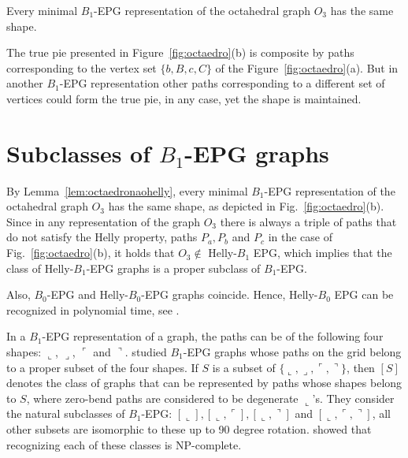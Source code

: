 \begin{lemma}\label{lem:octaedronaohelly}
Every minimal $B_1$-EPG representation of the octahedral graph $O_3$ has the same shape.
\end{lemma}

 


The true pie presented in Figure~\ref{fig:octaedro}(b) is composite by paths corresponding to the vertex set $\{b, B, c, C\}$ of the Figure~\ref{fig:octaedro}(a). But in another $B_1$-EPG representation other paths corresponding to a different set of vertices could form the true pie, in any case, yet the shape is maintained. 



\section{Subclasses of $B_1$-EPG graphs}


By Lemma~\ref{lem:octaedronaohelly}, every minimal $B_1$-EPG representation of the octahedral graph $O_3$ has the same shape, as depicted in Fig.~\ref{fig:octaedro}(b). 
Since in any representation of the graph $O_3$ there is always a triple of paths that do not satisfy the Helly property, paths $P_{a}, P_{b} $ and $P_{c}$ in the case of Fig.~\ref{fig:octaedro}(b), it holds that $O_3 \notin$ Helly-$B_1$ EPG, which implies that the class of Helly-$B_1$-EPG graphs is a proper subclass of $B_1$-EPG.

Also, $B_0$-EPG and Helly-$B_0$-EPG graphs coincide. Hence, Helly-$B_0$ EPG can be recognized in polynomial time, see \cite{booth1976}.


In a $B_1$-EPG representation of a graph, the paths can be of the following four shapes: $\llcorner$, $\lrcorner$, $\ulcorner$ and $\urcorner$. \cite{cameron2016edge} studied $B_1$-EPG graphs whose paths on the grid belong to a proper subset of the four shapes. If $S$ is a subset of $\{\llcorner, \lrcorner, \ulcorner, \urcorner\}$, then $[S]$ denotes the class of graphs that can be represented by paths whose shapes belong to $S$, where zero-bend paths are considered to be degenerate $\llcorner$'s. They consider the natural subclasses of $B_1$-EPG: $[\llcorner], [\llcorner, \ulcorner], [\llcorner, \urcorner]$ and $[\llcorner, \ulcorner, \urcorner]$, all other subsets are isomorphic
to these up to 90 degree rotation. \cite{cameron2016edge}  showed that recognizing each of these classes is NP-complete.

